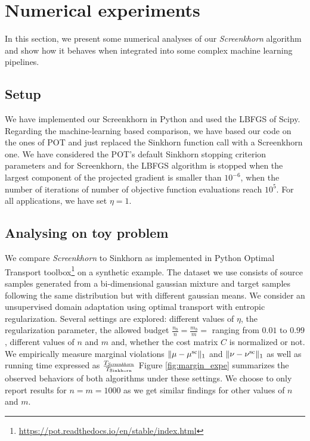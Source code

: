 
\section{Numerical experiments} %
\label{sec:numerical_experiments}

In this section, we present some numerical analyses of our
\emph{Screenkhorn} algorithm and show how it behaves when
integrated into some complex machine learning pipelines.

\subsection{Setup}

We have implemented our Screenkhorn in Python and used the LBFGS of
Scipy. Regarding the machine-learning based comparison, we have based our code
on the ones of POT \cite{flamary2017pot} and just replaced the Sinkhorn function call with a Screenkhorn one. We have considered the POT's default Sinkhorn stopping criterion parameters and for Screenkhorn, the LBFGS algorithm is stopped when the 
largest component of the projected gradient is smaller than $10^{-6}$, when the number of iterations of number of objective function evaluations reach $10^{5}$. For all applications, we have set $\eta=1$.

\subsection{Analysing on toy problem}

We compare \emph{Screenkhorn} to Sinkhorn as implemented in Python Optimal Transport toolbox\footnote{\url{https://pot.readthedocs.io/en/stable/index.html}} on  a synthetic example. The dataset we use consists of source samples generated from a bi-dimensional gaussian mixture and target samples following the same distribution but with different gaussian means. We consider an unsupervised domain adaptation using optimal transport with entropic regularization.  Several settings are explored: different values of $\eta$, the regularization parameter, the allowed budget $\frac{n_b}{n} = \frac{m_b}{m} = $ ranging from $0.01$ to $0.99$, different values of $n$ and $m$ and, whether the cost matrix $C$ is normalized or not. We empirically measure  marginal violations $\|{\mu} -{\mu}^{\text{sc}}\|_1$ and $\|{\nu} -{\nu}^{\text{sc}}\|_1$ as well as running time expressed as $\frac{T_{\text{\emph{Screenkhorn}}}}{T_{\text{Sinkhorn}}}$
Figure \ref{fig:margin_expe} summarizes the observed behaviors of both algorithms under these settings. We choose to only report results for $n=m=1000$ as we get similar findings for other values of $n$ and $m$. 

